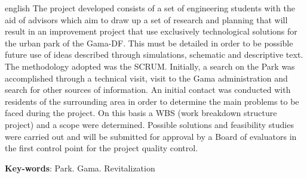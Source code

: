 \begin{resumo}[Abstract]
 \begin{otherlanguage*}{english}
   The project developed consists of a set of engineering students with the aid of advisors which aim to draw up a set of research and planning that will result in an improvement project that use exclusively technological solutions for the urban park of the Gama-DF. This must be detailed in order to be possible future use of ideas described through simulations, schematic and descriptive text. The methodology adopted was the SCRUM. Initially, a search on the Park was accomplished through a technical visit, visit to the Gama administration and search for other sources of information.  An initial contact was conducted with residents of the surrounding area in order to determine the main problems to be faced during the project. On this basis a WBS (work breakdown structure project) and a scope were determined. Possible solutions and feasibility studies were carried out and will be submitted for approval by a Board of evaluators in the first control point for the project quality control.

   \vspace{\onelineskip}
 
   \noindent 
   \textbf{Key-words}: Park. Gama. Revitalization
    \end{otherlanguage*}
\end{resumo}
